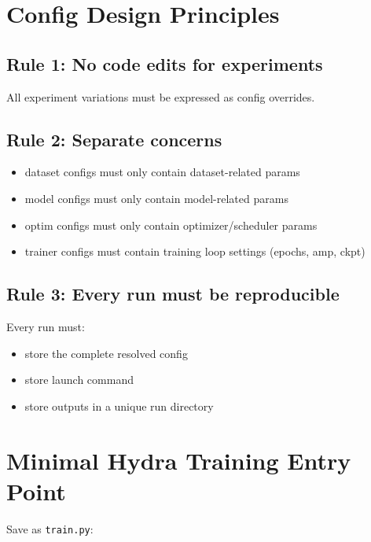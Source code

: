 \documentclass[11pt]{article}
\begin{document}
\section{Config Design Principles}
\subsection{Rule 1: No code edits for experiments}
All experiment variations must be expressed as config overrides.

\subsection{Rule 2: Separate concerns}
\begin{itemize}[nosep]
    \item dataset configs must only contain dataset-related params
    \item model configs must only contain model-related params
    \item optim configs must only contain optimizer/scheduler params
    \item trainer configs must contain training loop settings (epochs, amp, ckpt)
\end{itemize}

\subsection{Rule 3: Every run must be reproducible}
Every run must:
\begin{itemize}[nosep]
    \item store the complete resolved config
    \item store launch command
    \item store outputs in a unique run directory
\end{itemize}

\section{Minimal Hydra Training Entry Point}
Save as \texttt{train.py}:
\end{document}
